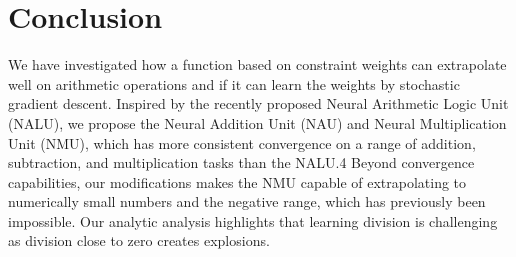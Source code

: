 \section{Conclusion}
We have investigated how a function based on constraint weights can extrapolate well on arithmetic operations and if it can learn the weights by stochastic gradient descent.
Inspired by the recently proposed Neural Arithmetic Logic Unit (NALU), we propose the Neural Addition Unit (NAU) and Neural Multiplication Unit (NMU), which has more consistent convergence on a range of addition, subtraction, and multiplication tasks than the NALU.4
Beyond convergence capabilities, our modifications makes the NMU capable of extrapolating to numerically small numbers and the negative range, which has previously been impossible.
Our analytic analysis highlights that learning division is challenging as division close to zero creates explosions.


